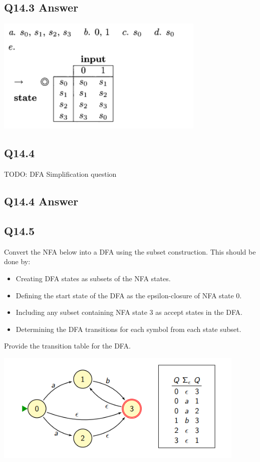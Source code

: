 \documentclass{article}
\begin{document}
\subsection*{Q14.3 Answer}
\begin{center}
    \includegraphics[width=10cm]{2.png}
\end{center}
\newpage
{}
\subsection*{Q14.4}
TODO: DFA Simplification question
\newpage
{}
\subsection*{Q14.4 Answer}
\newpage
{}
\subsection*{Q14.5}
Convert the NFA below into a DFA using the subset construction. This should be done by:
\begin{itemize}
  \item Creating DFA states as subsets of the NFA states.
  \item Defining the start state of the DFA as the epsilon-closure of NFA state 0.
  \item Including any subset containing NFA state 3 as accept states in the DFA.
  \item Determining the DFA transitions for each symbol from each state subset.
\end{itemize}
Provide the transition table for the DFA.
\begin{center}
    \includegraphics[width=12cm]{3.png}
\end{center}
\newpage
{}
\end{document}
